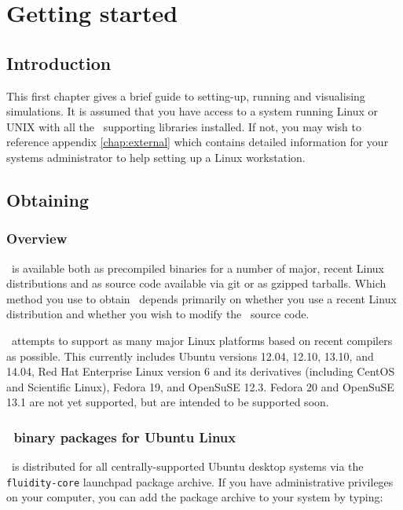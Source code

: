 \chapter{Getting started}\label{chap:gettingstarted}

\section{Introduction} This first chapter gives a brief guide to setting-up,
running and visualising simulations. It is assumed that you have access to a
system running Linux or UNIX with all the \fluidity\ supporting libraries
installed. If not, you may wish to reference appendix \ref{chap:external} which
contains detailed information for your systems administrator to help setting up
a Linux workstation. 

\section{Obtaining \fluidity}
\label{sec:obtaining_fluidity}

\subsection{Overview}
\label{sec:obtaining_fluidity_overview}

\fluidity\ is available both as precompiled binaries for a number of major,
recent Linux distributions and as source code available via git or as gzipped
tarballs. Which method you use to obtain \fluidity\ depends primarily on
whether you use a recent Linux distribution and whether you wish to modify the
\fluidity\ source code.

\fluidity\ attempts to support as many major Linux platforms based on recent
compilers as possible. This currently includes Ubuntu versions 12.04, 12.10,
13.10, and 14.04, Red Hat Enterprise Linux version 6 and its derivatives
(including CentOS and Scientific Linux), Fedora 19, and OpenSuSE 12.3. Fedora
20 and OpenSuSE 13.1 are not yet supported, but are intended to be supported
soon.

\subsection{\fluidity\ binary packages for Ubuntu Linux}

\fluidity\ is distributed for all centrally-supported Ubuntu desktop systems
via the \lstinline[language=Bash]+fluidity-core+ launchpad package archive. If
you have administrative privileges on your computer, you can add the package
archive to your system by typing:

